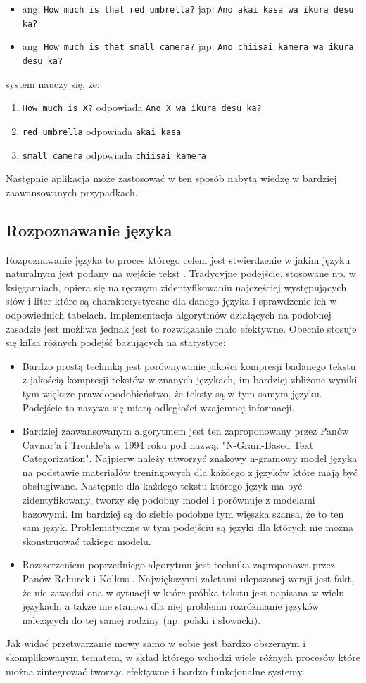  \begin{itemize}
	\item ang: \verb"How much is that red umbrella?" jap: \verb"Ano akai kasa wa ikura desu ka?"
	\item ang: \verb"How much is that small camera?" jap: \verb"Ano chiisai kamera wa ikura desu ka?"
\end{itemize} 
system nauczy się, że:
 \begin{enumerate}
	\item \verb"How much is X?" odpowiada \verb"Ano X wa ikura desu ka?"
	\item \verb"red umbrella" odpowiada \verb"akai kasa"
	\item \verb"small camera" odpowiada \verb"chiisai kamera"
\end{enumerate} 
Następnie aplikacja może zastosować w ten sposób nabytą wiedzę w bardziej zaawansowanych przypadkach.
\subsection{Rozpoznawanie języka}
Rozpoznawanie języka to proces którego celem jest stwierdzenie w jakim języku naturalnym jest podany na wejście tekst \cite{adams1997} . Tradycyjne podejście, stosowane np. w księgarniach, opiera się na ręcznym zidentyfikowaniu najczęściej występujących słów i liter które są charakterystyczne dla danego języka i sprawdzenie ich w odpowiednich tabelach. Implementacja algorytmów działących na podobnej zasadzie jest możliwa jednak jest to rozwiązanie mało efektywne. Obecnie stosuje się kilka różnych podejść bazujących na statystyce:
 \begin{itemize}
	\item Bardzo prostą techniką jest porównywanie jakości kompresji badanego tekstu z jakością kompresji tekstów w znanych językach, im bardziej zbliżone wyniki tym większe prawdopodobieństwo, że teksty są w tym samym języku. Podejście to nazywa się miarą odległości wzajemnej informacji.
	\item Bardziej zaawansowanym algorytmem jest ten zaproponowany przez Panów Cavnar'a i Trenkle'a w 1994 roku pod nazwą: "N-Gram-Based Text Categorization". Najpierw należy utworzyć znakowy n-gramowy model języka na podstawie materiałów treningowych dla każdego z języków które mają być obsługiwane. Następnie dla każdego tekstu którego język ma być zidentyfikowany, tworzy się podobny model i porównuje z modelami bazowymi. Im bardziej są do siebie podobne tym więszka szansa, że to ten sam język. Problematyczne w tym podejściu są języki dla których nie można skonstruować takiego modelu. 
	\item Rozszerzeniem poprzedniego algorytmu jest technika zaproponowa przez Panów Rehurek i Kolkus \cite{rehurek2009} . Największymi zaletami ulepszonej wersji jest fakt, że nie zawodzi ona w sytuacji w które próbka tekstu jest napisana w wielu językach, a także nie stanowi dla niej problemu rozróżnianie języków należących do tej samej rodziny (np. polski i słowacki). 
\end{itemize} 
Jak widać przetwarzanie mowy samo w sobie jest bardzo obszernym i skomplikowanym tematem, w skład którego wchodzi wiele różnych procesów które można zintegrować tworząc efektywne i bardzo funkcjonalne systemy.


